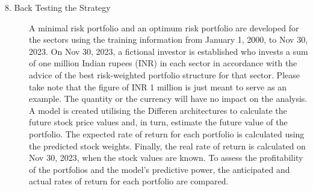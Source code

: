 \begin{description}
\item [8. Back Testing the Strategy] A minimal risk portfolio and an optimum risk portfolio are developed for the sectors using the training information from January 1, 2000, to Nov 30, 2023. On Nov 30, 2023, a fictional investor is established who invests a sum of one million Indian rupees (INR) in each sector in accordance with the advice of the best risk-weighted portfolio structure for that sector. Please take note that the figure of INR 1 million is just meant to serve as an example. The quantity or the currency will have no impact on the analysis. A model is created utilising the Differen architectures to calculate the future stock price values and, in turn, estimate the future value of the portfolio. The expected rate of return for each portfolio is calculated using the predicted stock weights. Finally, the real rate of return is calculated on Nov 30, 2023, when the stock values are known. To assess the profitability of the portfolios and the model's predictive power, the anticipated and actual rates of return for each portfolio are compared.
\end{description}
